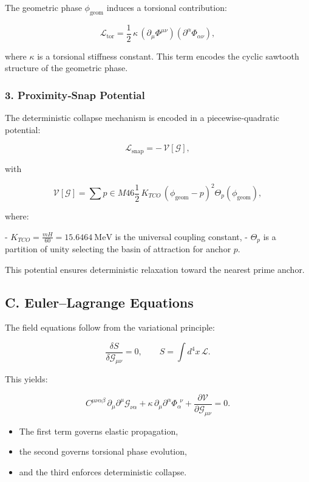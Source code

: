 \documentclass[reprint,amsmath,amssymb,aps,prl,floatfix]{revtex4-2}
\begin{document}
The geometric phase \(\phi_{\mathrm{geom}}\) induces a torsional contribution:

\[
\mathcal{L}_{\mathrm{tor}}
=
\frac{1}{2}\,\kappa\,
(\partial_\mu \Phi^{\mu\nu})
(\partial^\alpha \Phi_{\alpha\nu}),
\]

where \(\kappa\) is a torsional stiffness constant.  
This term encodes the cyclic sawtooth structure of the geometric phase.

\subsubsection{3. Proximity‑Snap Potential}

The deterministic collapse mechanism is encoded in a piecewise‑quadratic potential:

\[
\mathcal{L}_{\mathrm{snap}}
=
-\,\mathcal{V}[\mathcal{G}],
\]

with

\[
\mathcal{V}[\mathcal{G}]
=
\sum{p\in M{46}}
\frac{1}{2}\,K_{TCO}\,
\left(\phi_{\mathrm{geom}} - p\right)^2
\Theta_p(\phi_{\mathrm{geom}}),
\]

where:

- \(K_{TCO} = \frac{mH}{60} = 15.6464\ \mathrm{MeV}\) is the universal coupling constant,  
- \(\Theta_p\) is a partition of unity selecting the basin of attraction for anchor \(p\).

This potential ensures deterministic relaxation toward the nearest prime anchor.

\subsection{C. Euler–Lagrange Equations}

The field equations follow from the variational principle:

\[
\frac{\delta S}{\delta \mathcal{G}_{\mu\nu}} = 0,
\qquad
S = \int d^4x\,\mathcal{L}.
\]

This yields:

\[
C^{\mu\nu\alpha\beta}\,\partial_\mu\partial^\mu \mathcal{G}_{\nu\alpha}
+
\kappa\,\partial_\mu\partial^\alpha \Phi_{\alpha}^{\ \ \nu}
+
\frac{\partial \mathcal{V}}{\partial \mathcal{G}_{\mu\nu}}
= 0.
\]
\begin{itemize}
\item The first term governs elastic propagation,  
\item the second governs torsional phase evolution,  
\item and the third enforces deterministic collapse.
\end{itemize}
\end{document}
